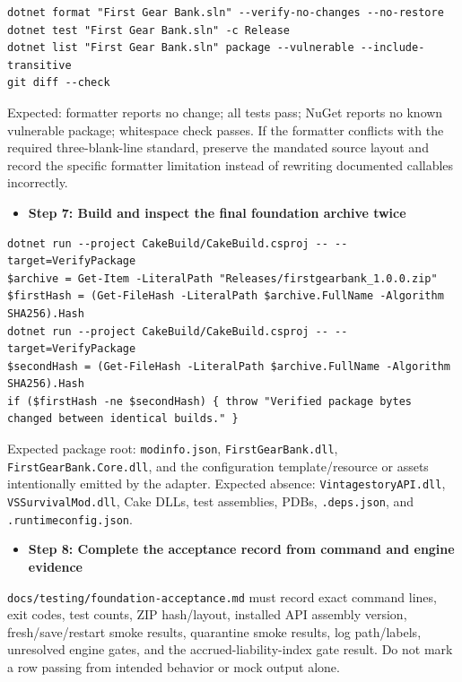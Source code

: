 \documentclass[
  10pt,
  letterpaper,
]{article}
\newcommand{\passthrough}[1]{#1}
\providecommand{\tightlist}{%
  \setlength{\itemsep}{0pt}\setlength{\parskip}{0pt}}
\begin{document}
\begin{lstlisting}
dotnet format "First Gear Bank.sln" --verify-no-changes --no-restore
dotnet test "First Gear Bank.sln" -c Release
dotnet list "First Gear Bank.sln" package --vulnerable --include-transitive
git diff --check
\end{lstlisting}

Expected: formatter reports no change; all tests pass; NuGet reports no
known vulnerable package; whitespace check passes. If the formatter
conflicts with the required three-blank-line standard, preserve the
mandated source layout and record the specific formatter limitation
instead of rewriting documented callables incorrectly.

\begin{itemize}
\tightlist
\item[$\square$]
  \textbf{Step 7: Build and inspect the final foundation archive twice}
\end{itemize}

\begin{lstlisting}
dotnet run --project CakeBuild/CakeBuild.csproj -- --target=VerifyPackage
$archive = Get-Item -LiteralPath "Releases/firstgearbank_1.0.0.zip"
$firstHash = (Get-FileHash -LiteralPath $archive.FullName -Algorithm SHA256).Hash
dotnet run --project CakeBuild/CakeBuild.csproj -- --target=VerifyPackage
$secondHash = (Get-FileHash -LiteralPath $archive.FullName -Algorithm SHA256).Hash
if ($firstHash -ne $secondHash) { throw "Verified package bytes changed between identical builds." }
\end{lstlisting}

Expected package root: \passthrough{\lstinline!modinfo.json!},
\passthrough{\lstinline!FirstGearBank.dll!},
\passthrough{\lstinline!FirstGearBank.Core.dll!}, and the configuration
template/resource or assets intentionally emitted by the adapter.
Expected absence: \passthrough{\lstinline!VintagestoryAPI.dll!},
\passthrough{\lstinline!VSSurvivalMod.dll!}, Cake DLLs, test assemblies,
PDBs, \passthrough{\lstinline!.deps.json!}, and
\passthrough{\lstinline!.runtimeconfig.json!}.

\begin{itemize}
\tightlist
\item[$\square$]
  \textbf{Step 8: Complete the acceptance record from command and engine
  evidence}
\end{itemize}

\texttt{docs/}\allowbreak{}\texttt{testing/}\allowbreak{}\texttt{foundation-}\allowbreak{}\texttt{acceptance.}\allowbreak{}\texttt{md}
must record exact command lines, exit codes, test counts, ZIP
hash/layout, installed API assembly version,
fresh/\allowbreak{}save/\allowbreak{}restart smoke results, quarantine
smoke results, log path/labels, unresolved engine gates, and the
accrued-liability-index gate result. Do not mark a row passing from
intended behavior or mock output alone.
\end{document}
